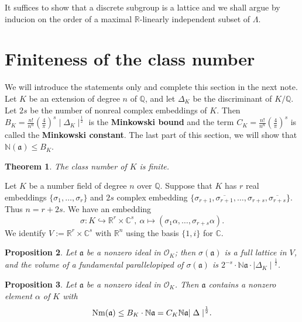 \documentclass[11pt,a4paper,reqno]{amsart}
\numberwithin{equation}{section}
\newtheorem{thm}{Theorem}[section]
\newtheorem{prop}[thm]{Proposition}
\begin{document}
It suffices to show that a discrete subgroup is a lattice and we shall argue by inducion on the order of a maximal $\mathbb{R}$-linearly independent subset of $\Lambda$.

\section{Finiteness of the class number} 

We will introduce the statements only and complete this section in the next note. \\

Let $K$ be an extension of degree $n$ of $\mathbb{Q}$, and let $\Delta _K$ be the discriminant of $K/\mathbb{Q}$.
 Let $2s$ be the number of nonreal complex embeddings of $K$.
 Then $B_K = \frac{n!}{n^n} \left(\frac{4}{\pi} \right)^s \mid \Delta _K \mid ^\frac{1}{2}$ is the \textbf{Minkowski bound}
 and the term $C_K = \frac{n!}{n^n} \left(\frac{4}{\pi} \right)^s$ is called the \textbf{Minkowski constant}.
 The last part of this section, we will show that $\mathbb{N}(\mathfrak{a}) \le B_K$.

\begin{thm} \label{4.4}
The class number of $K$ is finite.
\end{thm}

Let $K$ be a number field of degree $n$ over $\mathbb{Q}$. Suppose that $K$ has $r$ real embeddings $\{ \sigma_1,\dots, \sigma_r \}$ and $2s$ complex embedding $\{ \sigma_{r+1},\overline{\sigma_{r+1}},\dots, \sigma_{r+s},\overline{\sigma_{r+s}}\}$. Thus $n=r+2s$. We have an embedding
\[
\sigma : K \hookrightarrow {\mathbb{R}^r} \times {\mathbb{C}^s},~ \alpha \mapsto ( \sigma_1 \alpha, \dots, \sigma_{r+s} \alpha).
\]
We identify $V := {\mathbb{R}^r} \times {\mathbb{C}^s}$ with $\mathbb{R}^n$ using the basis $\{1,i\}$ for $\mathbb{C}$.

\begin{prop} 
Let $\mathfrak{a}$ be a nonzero ideal in $\mathcal{O}_K$; then $\sigma(\mathfrak{a})$ is a full lattice in $V$, and the volume of a fundamental parallelopiped of $\sigma(\mathfrak{a})$ is ${2^{-s}}\cdot{\mathbb{N}\mathfrak{a}}\cdot{\mid \Delta_K \mid}^\frac{1}{2}$.
\end{prop}

\begin{prop} 
Let $\mathfrak{a}$ be a nonzero ideal in $\mathcal{O}_K$.
Then $\mathfrak{a}$ contains a nonzero element $\alpha$ of $K$ with
\[
{\rm Nm}(\mathfrak{a}) \le B_K \cdot \mathbb{N}\mathfrak{a} = C_K \mathbb{N} \mathfrak{a} {\mid \Delta \mid}^{\frac{1}{2}}.
\]
\end{prop}
\end{document}

